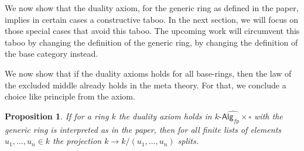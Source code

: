 \documentclass[10pt,a4paper]{article}
\newtheorem{proposition}{Proposition}[section]
\newcommand{\Alg}{\mathsf{Alg}}
\begin{document}
We now show that the duality axiom, for the generic ring as defined in the paper, implies in certain cases a constructive taboo.
In the next section, we will focus on those special cases that avoid this taboo.
The upcoming work will circumvent this taboo by changing the definition of the generic ring, by changing the definition of the base category instead.

We now show that if the duality axioms holds for all base-rings, then the law of the excluded middle already holds in the meta theory.
For that, we conclude a choice like principle from the axiom.

\begin{proposition}\label{prop:strict-duality-implies-lem}
  If for a ring $k$ the duality axiom holds in \(\widehat{k\text{-}\Alg_{fp} \times \square}\) with the generic ring is interpreted as in the paper, then for all finite lists of elements $u_1, \ldots, u_n \in k$ the projection $k \to k /(u_1, \ldots, u_n)$ splits.
\end{proposition}
\end{document}

